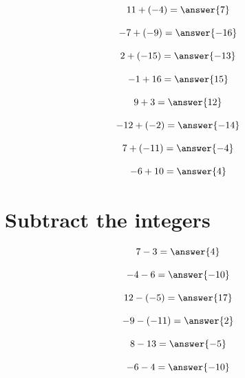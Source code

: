 \documentclass{ximera}
\begin{document}
\begin{problem}
\[
11 + (-4) = \answer{7}
\]
\end{problem}

\begin{problem}
\[
-7 + (-9) = \answer{-16}
\]
\end{problem}

\begin{problem}
\[
2 + (-15) = \answer{-13}
\]
\end{problem}

\begin{problem}
\[
-1 + 16 = \answer{15}
\]
\end{problem}

\begin{problem}
\[
9 + 3 = \answer{12}
\]
\end{problem}

\begin{problem}
\[
-12 + (-2) = \answer{-14}
\]
\end{problem}

\begin{problem}
\[
7 + (-11) = \answer{-4}
\]
\end{problem}

\begin{problem}
\[
-6 + 10 = \answer{4}
\]
\end{problem}


\section*{Subtract the integers}

\begin{problem}
\[
7 - 3 = \answer{4}
\]
\end{problem}

\begin{problem}
\[
-4 - 6 = \answer{-10}
\]
\end{problem}

\begin{problem}
\[
12 - (-5) = \answer{17}
\]
\end{problem}

\begin{problem}
\[
-9 - (-11) = \answer{2}
\]
\end{problem}

\begin{problem}
\[
8 - 13 = \answer{-5}
\]
\end{problem}

\begin{problem}
\[
-6 - 4 = \answer{-10}
\]
\end{problem}
\end{document}
